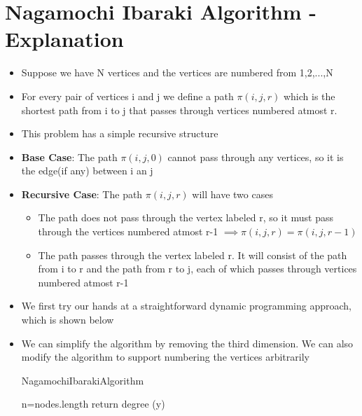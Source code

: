 \documentclass[12pt,letterpaper,titlepage,en-US]{article}
\begin{document}
\section{Nagamochi Ibaraki Algorithm - Explanation}
\begin{itemize}
\item Suppose we have N vertices and the vertices are numbered from 1,2,...,N

\item For every pair of vertices i and j we define a path $\pi(i,j,r)$ which is  the shortest path from i to j that passes through vertices numbered atmost r.

\item This problem has a simple recursive structure

\item \textbf{Base Case}: The path $\pi(i,j,0)$ cannot pass through any vertices, so it is the edge(if any) between i an j

\item \textbf{Recursive Case}: The path $\pi(i,j,r)$ will have two cases
\begin{itemize}
\item The path does not pass through the vertex labeled r, so it must pass through the vertices numbered atmost r-1 $\implies \pi(i,j,r) = \pi(i,j,r-1)$

\item The path passes through the vertex labeled r. It will consist of the path from i to r and the path from r to j, each of which passes through vertices numbered atmost r-1 



\end{itemize}


\item We first try our hands at a straightforward dynamic programming approach, which is shown below





\item  We can simplify the algorithm by removing the third dimension. We can also modify the algorithm to support numbering the vertices arbitrarily
\begin{algorithm}[H]
    \caption{NagamochiIbarakiAlgorithm}
    \begin{algorithmic}[1]
      
      \State n=nodes.length
      \State return degree (y)
      \EndIf
      

\end{algorithmic}
\end{algorithm}
\end{itemize}
\end{document}
